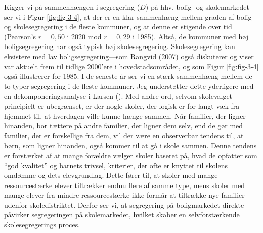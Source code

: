 \documentclass[
]{book}
\begin{document}
Kigger vi på sammenhængen i segregering (\(D\)) på hhv. bolig- og skolemarkedet ser vi i Figur \ref{fig:fig-3-4}, at der er en klar sammenhæng mellem graden af bolig- og skolesegregering i de fleste kommuner, og at denne er stigende over tid (Pearson's \(r=0,50\) i 2020 mod \(r=0,29\) i 1985). Altså, de kommuner med høj boligsegregering har også typisk høj skolesegregering. Skolesegregering kan eksistere med lav boligsegregering---som Rangvid (2007) også diskuterer og viser var aktuelt frem til tidlige 2000'ere i hovedstadsområdet, og som Figur \ref{fig:fig-3-4} også illustrerer for 1985. I de seneste år ser vi en stærk sammenhæng mellem de to typer segregering i de fleste kommuner. Jeg understøtter dette yderligere med en dekomponeringsanalyse i Larsen (). Med andre ord, selvom skolevalget principielt er ubegrænset, er der nogle skoler, der logisk er for langt væk fra hjemmet til, at hverdagen ville kunne hænge sammen. Når familier, der ligner hinanden, bor tættere på andre familier, der ligner dem selv, end de gør med familier, der er forskellige fra dem, vil der være en observerbar tendens til, at børn, som ligner hinanden, også kommer til at gå i skole sammen. Denne tendens er forstærket af at mange forældre vælger skoler baseret på, hvad de opfatter som ``god kvalitet'' og barnets trivsel, kriterier, der ofte er knyttet til skolens omdømme og dets elevgrundlag. Dette fører til, at skoler med mange ressourcestærke elever tiltrækker endnu flere af samme type, mens skoler med mange elever fra mindre ressourcestærke ikke formår at tiltrække nye familier udenfor skoledistriktet. Derfor ser vi, at segregering på boligmarkedet direkte påvirker segregeringen på skolemarkedet, hvilket skaber en selvforstærkende skolesegregerings proces.
\end{document}
